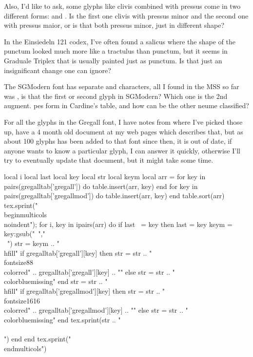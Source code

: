 \documentclass[a4paper]{article}
\begin{document}
Also, I'd like to ask, some glyphs like clivis combined with pressus come
in two different forms:
\quad{}\quad and
\quad{}\quad.  Is the first one clivis with
pressus minor and the second one with pressus maior, or is that both pressus
minor, just in different shape?

In the Einsiedeln 121 codex, I've often found a salicus where the shape of
the punctum looked much more like a tractulus than punctum, but it seems
in Graduale Triplex that is usually painted just as punctum.  Is that just
an insignificant change one can ignore?

The SGModern font has separate {\fontsize{16}{16}\color{red}\GreGallModern{}}\quad and \quad
characters, all I found in the MSS so far was \quad, is that
the first or second glyph in SGModern?  Which one is the 2nd augment. pes form in
Cardine's table, and how can be the other neume classified?

For all the glyphs in the Gregall font, I have notes from where I've picked
those up, have a 4 month old document at my web pages which describes that,
but as about 100 glyphs has been added to that font since then, it is out of
date, if anyone wants to know a particular glyph, I can answer it quickly,
otherwise I'll try to eventually update that document, but it might take
some time.

\vfill
\leavevmode
{}
\vfill
\leavevmode
{}
\vfill
\leavevmode
{}
\vfill
\leavevmode
{}
\vfill

\begin{luacode*}
  local i
  local last
  local key
  local str
  local keym
  local arr = {}
  for key in pairs(gregalltab['gregall']) do
    table.insert(arr, key)
  end
  for key in pairs(gregalltab['gregallmod']) do
    table.insert(arr, key)
  end
  table.sort(arr)
  tex.sprint("\\begin{multicols}{3}\\noindent");
  for i, key in ipairs(arr) do
    if last ~= key then
      last = key
      keym = key:gsub("~","\\~{}")
      str = keym .. "\\hfill"
      if gregalltab['gregall'][key] then
        str = str .. "{\\fontsize{8}{8}\\color{red}" .. gregalltab['gregall'][key] .. "}"
      else
        str = str .. "{\\color{blue}missing}"
      end
      str = str .. "\\hfill"
      if gregalltab['gregallmod'][key] then
        str = str .. "{\\fontsize{16}{16}\\color{red}" .. gregalltab['gregallmod'][key] .. "}"
      else
        str = str .. "{\\color{blue}missing}"
      end
      tex.sprint(str .. "\\\\")
    end
  end
  tex.sprint("\\end{multicols}")
\end{luacode*}
\end{document}
